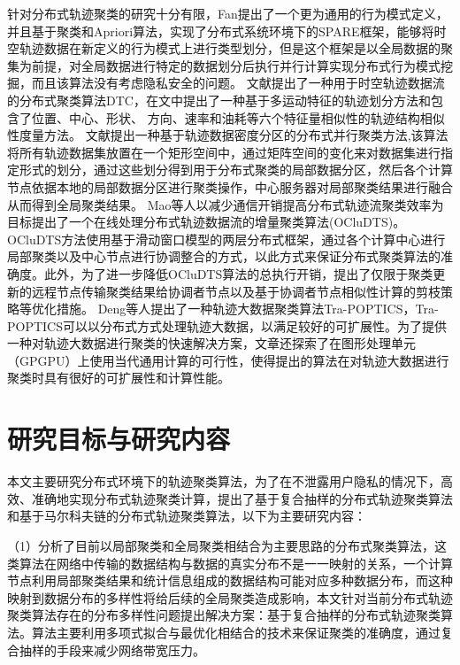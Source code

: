 针对分布式轨迹聚类的研究十分有限，Fan提出了一个更为通用的行为模式定义，并且基于聚类和Apriori算法，实现了分布式系统环境下的SPARE框架，能够将时空轨迹数据在新定义的行为模式上进行类型划分，但是这个框架是以全局数据的聚集为前提，对全局数据进行特定的数据划分后执行并行计算实现分布式行为模式挖掘，而且该算法没有考虑隐私安全的问题。
文献\cite{肖源分布式车辆时空轨迹异常检测算法研究}提出了一种用于时空轨迹数据流的分布式聚类算法DTC，在文中提出了一种基于多运动特征的轨迹划分方法和包含了位置、中心、形状、
方向、速率和油耗等六个特征量相似性的轨迹结构相似性度量方法。
文献\cite{Wang2018A}提出一种基于轨迹数据密度分区的分布式并行聚类方法,该算法将所有轨迹数据集放置在一个矩形空间中，通过矩阵空间的变化来对数据集进行指定形式的划分，通过这些划分得到用于分布式聚类的局部数据分区，然后各个计算节点依据本地的局部数据分区进行聚类操作，中心服务器对局部聚类结果进行融合从而得到全局聚类结果。
Mao等人以减少通信开销提高分布式轨迹流聚类效率为目标提出了一个在线处理分布式轨迹数据流的增量聚类算法(OCluDTS)。OCluDTS方法使用基于滑动窗口模型的两层分布式框架，通过各个计算中心进行局部聚类以及中心节点进行协调整合的方式，以此方式来保证分布式聚类算法的准确度。此外，为了进一步降低OCluDTS算法的总执行开销，提出了仅限于聚类更新的远程节点传输聚类结果给协调者节点以及基于协调者节点相似性计算的剪枝策略等优化措施。
Deng等人提出了一种轨迹大数据聚类算法Tra-POPTICS，Tra-POPTICS可以以分布式方式处理轨迹大数据，以满足较好的可扩展性。为了提供一种对轨迹大数据进行聚类的快速解决方案，文章还探索了在图形处理单元（GPGPU）上使用当代通用计算的可行性，使得提出的算法在对轨迹大数据进行聚类时具有很好的可扩展性和计算性能。


\section{研究目标与研究内容}

本文主要研究分布式环境下的轨迹聚类算法，为了在不泄露用户隐私的情况下，高效、准确地实现分布式轨迹聚类计算，提出了基于复合抽样的分布式轨迹聚类算法和基于马尔科夫链的分布式轨迹聚类算法，以下为主要研究内容：

（1）分析了目前以局部聚类和全局聚类相结合为主要思路的分布式聚类算法，这类算法在网络中传输的数据结构与数据的真实分布不是一一映射的关系，一个计算节点利用局部聚类结果和统计信息组成的数据结构可能对应多种数据分布，而这种映射到数据分布的多样性将给后续的全局聚类造成影响，本文针对当前分布式轨迹聚类算法存在的分布多样性问题提出解决方案：基于复合抽样的分布式轨迹聚类算法。算法主要利用多项式拟合与最优化相结合的技术来保证聚类的准确度，通过复合抽样的手段来减少网络带宽压力。

